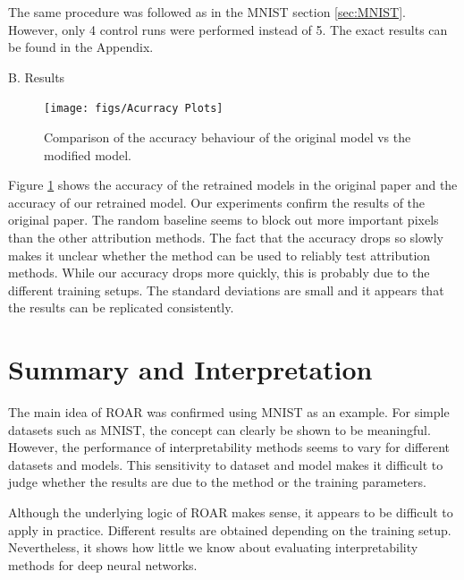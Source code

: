 The same procedure was followed as in the MNIST section \ref{sec:MNIST}. However, only 4 control runs were performed instead of 5. The exact results can be found in the Appendix.

B. Results

\begin{figure}[H]
	\centering
	\texttt{[image: figs/Acurracy Plots]}
	\caption {Comparison of the accuracy behaviour of the original model vs the modified model.}
	\label{fig:food101Res}
\end{figure}

Figure \ref{fig:food101Res} shows the accuracy of the retrained models in the original paper and the accuracy of our retrained model. Our experiments confirm the results of the original paper. The random baseline seems to block out more important pixels than the other attribution methods. The fact that the accuracy drops so slowly makes it unclear whether the method can be used to reliably test attribution methods. While our accuracy drops more quickly, this is probably due to the different training setups. The standard deviations are small and it appears that the results can be replicated consistently.

\section{Summary and Interpretation}

The main idea of ROAR was confirmed using MNIST as an example. For simple datasets such as MNIST, the concept can clearly be shown to be meaningful. However, the performance of interpretability methods seems to vary for different datasets and models. This sensitivity to dataset and model makes it difficult to judge whether the results are due to the method or the training parameters.

Although the underlying logic of ROAR makes sense, it appears to be difficult to apply in practice. Different results are obtained depending on the training setup. Nevertheless, it shows how little we know about evaluating interpretability methods for deep neural networks.


